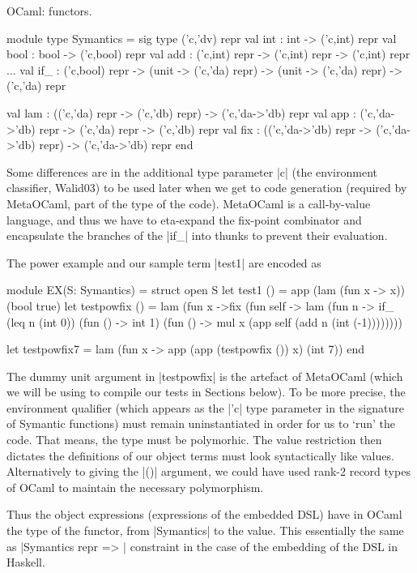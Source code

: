 \documentclass[preprint]{sigplanconf}
\begin{document}
OCaml: functors.

\begin{code}
module type Symantics = sig
  type ('c,'dv) repr
  val int  : int  -> ('c,int) repr
  val bool : bool -> ('c,bool) repr
  val add  : ('c,int) repr -> ('c,int) repr -> ('c,int) repr
  ...
  val if_ : ('c,bool) repr ->
             (unit -> ('c,'da) repr) ->
             (unit -> ('c,'da) repr) -> ('c,'da) repr 

  val lam : (('c,'da) repr -> ('c,'db) repr) 
          -> ('c,'da->'db) repr
  val app : ('c,'da->'db) repr
    -> ('c,'da) repr -> ('c,'db) repr
  val fix : (('c,'da->'db) repr -> ('c,'da->'db) repr) 
            -> ('c,'da->'db) repr
end
\end{code}

Some differences are in the additional type parameter |c| (the
environment classifier, Walid03) to be used later when we get to code
generation (required by MetaOCaml, part of the type of the
code). MetaOCaml is a call-by-value language, and thus we have to eta-expand
the fix-point combinator and encapsulate the branches of the |if_|
into thunks to prevent their evaluation. 

The power example and our sample term |test1| are encoded as
\begin{code}
module EX(S: Symantics) = struct
 open S
 let test1 () = app (lam (fun x -> x)) (bool true)
 let testpowfix () = 
   lam (fun x ->fix (fun self -> lam (fun n ->
         if_ (leq n (int 0)) (fun () -> int 1)
             (fun () -> mul x (app self (add n (int (-1))))))))

 let testpowfix7 = 
    lam (fun x -> app (app (testpowfix ()) x) (int 7))
end
\end{code}
The dummy unit argument in |testpowfix| is the artefact of MetaOCaml
(which we will be using to compile our tests in Sections below). To be
more precise, the environment qualifier (which appears as the |'c|
type parameter in the signature of Symantic functions) must remain
uninstantiated in order for us to `run' the code. That means, the type
must be polymorhic. The value restriction then dictates 
the definitions of our object terms must look syntactically like
values. Alternatively to giving the |()| argument, we could have used
rank-2 record types of OCaml to maintain the necessary polymorphism.

Thus the object expressions (expressions of the embedded DSL) have in
OCaml the type of the functor, from |Symantics| to the value. This
essentially the same as |Symantics repr => | constraint in the case of
the embedding of the DSL in Haskell.
\end{document}
